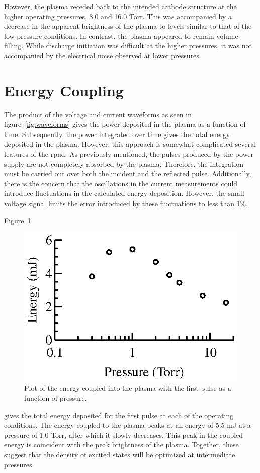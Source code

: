 However, the plasma receded back to the intended cathode structure at the higher
operating pressures, 8.0 and 16.0 Torr. This was accompanied by a decrease in
the apparent brightness of the plasma to levels similar to that of the low
pressure conditions. In contrast, the plasma appeared to remain volume-filling.
While discharge initiation was difficult at the higher pressures, it was not
accompanied by the electrical noise observed at lower pressures.

\section{Energy Coupling}

The product of the voltage and current waveforms as seen in
figure~\ref{fig:waveforms} gives the power deposited in the plasma as a function
of time. Subsequently, the power integrated over time gives the total energy
deposited in the plasma. However, this approach is somewhat complicated several
features of the \acs{rpnd}. As previously mentioned, the pulses produced by the
power supply are not completely absorbed by the plasma. Therefore, the
integration must be carried out over both the incident and the reflected pulse.
Additionally, there is the concern that the oscillations in the current
measurements could introduce fluctuations in the calculated energy deposition.
However, the small voltage signal limits the error introduced by these
fluctuations to less than 1\%.

Figure~\ref{fig:energies}
\begin{figure}
  \centering
  \includegraphics{./chapters/experiment/figures/energies.eps}
  \caption{Plot of the energy coupled into the plasma with the first pulse as
  a function of pressure.}
  \label{fig:energies}
\end{figure}
gives the total energy deposited for the first pulse at each of the operating
conditions. The energy coupled to the plasma peaks at an energy of 5.5 mJ at a
pressure of 1.0 Torr, after which it slowly decreases. This peak in the coupled
energy is coincident with the peak brightness of the plasma. Together, these
suggest that the density of excited states will be optimized at intermediate
pressures. 

